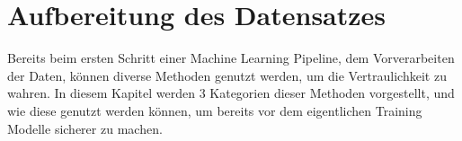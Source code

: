 \section{Aufbereitung des Datensatzes}\label{sec:aufbereitung_datensatz}

Bereits beim ersten Schritt einer Machine Learning Pipeline, dem Vorverarbeiten der Daten, können diverse Methoden genutzt werden, um die Vertraulichkeit zu wahren.
In diesem Kapitel werden 3 Kategorien dieser Methoden vorgestellt, und wie diese genutzt werden können, um bereits vor dem eigentlichen Training Modelle sicherer zu machen.



